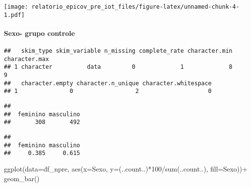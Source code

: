 \documentclass[
]{article}
\newenvironment{Shaded}{\begin{snugshade}}{\end{snugshade}}
\newcommand{\AttributeTok}[1]{\textcolor[rgb]{0.77,0.63,0.00}{#1}}
\newcommand{\DecValTok}[1]{\textcolor[rgb]{0.00,0.00,0.81}{#1}}
\newcommand{\FunctionTok}[1]{\textcolor[rgb]{0.00,0.00,0.00}{#1}}
\newcommand{\NormalTok}[1]{#1}
\newcommand{\SpecialCharTok}[1]{\textcolor[rgb]{0.00,0.00,0.00}{#1}}
\begin{document}
\texttt{[image: relatorio\_epicov\_pre\_iot\_files/figure-latex/unnamed-chunk-4-1.pdf]}

\hypertarget{sexo--grupo-controle}{%
\paragraph{\texorpdfstring{\textbf{Sexo- grupo
controle}}{Sexo- grupo controle}}\label{sexo--grupo-controle}}

\begin{Shaded}
\end{Shaded}

\begin{verbatim}
##   skim_type skim_variable n_missing complete_rate character.min character.max
## 1 character          data         0             1             8             9
##   character.empty character.n_unique character.whitespace
## 1               0                  2                    0
\end{verbatim}

\begin{Shaded}
\end{Shaded}

\begin{verbatim}
## 
##  feminino masculino 
##       308       492
\end{verbatim}

\begin{Shaded}
\end{Shaded}

\begin{verbatim}
## 
##  feminino masculino 
##     0.385     0.615
\end{verbatim}

\begin{Shaded}
\begin{Highlighting}[]
\FunctionTok{ggplot}\NormalTok{(}\AttributeTok{data=}\NormalTok{df\_npre, }\FunctionTok{aes}\NormalTok{(}\AttributeTok{x=}\NormalTok{Sexo, }\AttributeTok{y=}\NormalTok{(..count..)}\SpecialCharTok{*}\DecValTok{100}\SpecialCharTok{/}\FunctionTok{sum}\NormalTok{(..count..), }\AttributeTok{fill=}\NormalTok{Sexo))}\SpecialCharTok{+}
  \FunctionTok{geom\_bar}\NormalTok{()}
\end{Highlighting}
\end{Shaded}
\end{document}
